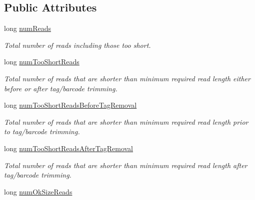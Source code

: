 \subsection*{Public Attributes}
\begin{DoxyCompactItemize}
\item 
\hypertarget{structTorrentReadStatsBundle_a312eaafbe765c12dabf9c74c5047e9d4}{long \hyperlink{structTorrentReadStatsBundle_a312eaafbe765c12dabf9c74c5047e9d4}{num\-Reads}}\label{structTorrentReadStatsBundle_a312eaafbe765c12dabf9c74c5047e9d4}

\begin{DoxyCompactList}\small\item\em Total number of reads including those too short. \end{DoxyCompactList}\item 
\hypertarget{structTorrentReadStatsBundle_aadd3dedadddb30c2c6c8116250e5e915}{long \hyperlink{structTorrentReadStatsBundle_aadd3dedadddb30c2c6c8116250e5e915}{num\-Too\-Short\-Reads}}\label{structTorrentReadStatsBundle_aadd3dedadddb30c2c6c8116250e5e915}

\begin{DoxyCompactList}\small\item\em Total number of reads that are shorter than minimum required read length either before or after tag/barcode trimming. \end{DoxyCompactList}\item 
\hypertarget{structTorrentReadStatsBundle_a88186ff7653c041eb76daf84ac244806}{long \hyperlink{structTorrentReadStatsBundle_a88186ff7653c041eb76daf84ac244806}{num\-Too\-Short\-Reads\-Before\-Tag\-Removal}}\label{structTorrentReadStatsBundle_a88186ff7653c041eb76daf84ac244806}

\begin{DoxyCompactList}\small\item\em Total number of reads that are shorter than minimum required read length prior to tag/barcode trimming. \end{DoxyCompactList}\item 
\hypertarget{structTorrentReadStatsBundle_ad5611072f42ff29fbd46e8839af41971}{long \hyperlink{structTorrentReadStatsBundle_ad5611072f42ff29fbd46e8839af41971}{num\-Too\-Short\-Reads\-After\-Tag\-Removal}}\label{structTorrentReadStatsBundle_ad5611072f42ff29fbd46e8839af41971}

\begin{DoxyCompactList}\small\item\em Total number of reads that are shorter than minimum required read length after tag/barcode trimming. \end{DoxyCompactList}\item 
\hypertarget{structTorrentReadStatsBundle_a4de93101d7aa7c1e9297345b4faf5618}{long \hyperlink{structTorrentReadStatsBundle_a4de93101d7aa7c1e9297345b4faf5618}{num\-Ok\-Size\-Reads}}\label{structTorrentReadStatsBundle_a4de93101d7aa7c1e9297345b4faf5618}


\end{DoxyCompactItemize}
